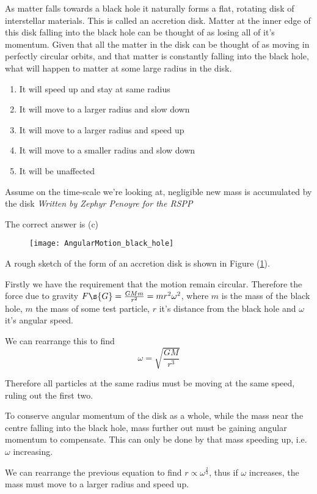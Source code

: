 \begin{hint} 
{As matter falls towards a black hole it naturally forms a flat, rotating disk of interstellar materials. This is called an accretion disk. Matter at the inner edge of this disk falling into the black hole can be thought of as losing all of it's momentum. Given that all the matter in the disk can be thought of as moving in perfectly circular orbits, and that matter is constantly falling into the black hole, what will happen to matter at some large radius in the disk.

\begin{enumerate}
	\item It will speed up and stay at same radius
	\item It will move to a larger radius and slow down
	\item It will move to a larger radius and speed up
	\item It will move to a smaller radius and slow down
	\item It will be unaffected
\end{enumerate}}
{Assume on the time-scale we're looking at, negligible new mass is accumulated by the disk}
{\textit{Written by Zephyr Penoyre for the RSPP}}
{The correct answer is (c)

\begin{figure}[h]
\centering
\texttt{[image: AngularMotion\_black\_hole]}
\label{fig:AngularMotion_black_hole}
\end{figure}

A rough sketch of the form of an accretion disk is shown in Figure (\ref{fig:AngularMotion_black_hole}).

Firstly we have the requirement that the motion remain circular. Therefore the force due to gravity $F\s{G} = \frac{GMm}{r^2} = mr^2 \omega^2$, where $m$ is the mass of the black hole, $m$ the mass of some test particle, $r$ it's distance from the black hole and $\omega$ it's angular speed.

We can rearrange this to find
\begin{equation*}
\omega = \sqrt{\dfrac{GM}{r^3}}
\end{equation*}

Therefore all particles at the same radius must be moving at the same speed, ruling out the first two.

To conserve angular momentum of the disk as a whole, while the mass near the centre falling into the black hole, mass further out must be gaining angular momentum to compensate. This can only be done by that mass speeding up, i.e. $\omega$ increasing.

We can rearrange the previous equation to find $r \propto \omega^{\frac{2}{3}}$, thus if $\omega$ increases, the mass must move to a larger radius and speed up.
}
\end{hint}
